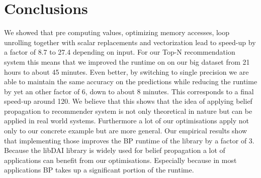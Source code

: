 \section{Conclusions}
We showed that pre computing values, optimizing memory accesses, loop unrolling together with scalar replacements and vectorization lead to speed-up by a factor of 8.7 to 27.4 depending on input. For our Top-N recommendation system this means that we improved the runtime on on our big dataset from 21 hours to about 45 minutes. Even better, by switching to single precision we are able to maintain the same accuracy on the predictions while reducing the runtime by yet an other factor of 6, down to about 8 minutes. This corresponds to a final speed-up around 120. We believe that this shows that the idea of applying belief propagation to recommender system is not only theoretical in nature but can be applied in real world systems. Furthermore a lot of our optimisations apply not only to our concrete example but are more general. Our empirical results show that implementing those improves the BP runtime of the library by a factor of 3. Because the libDAI library is widely used for belief propagation a lot of applications can benefit from our optimisations. Especially because in most applications BP takes up a significant portion of the runtime.